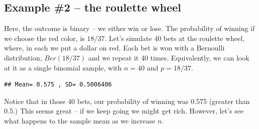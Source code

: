 \subsection{Example \#2 -- the roulette wheel}
Here, the outcome is binary -- we either win or lose. The probability of winning if we choose the red color, is $18/37$.
Let's simulate 40 bets at the roulette wheel, where, in each we put a dollar on red. Each bet is won with a Bernoulli distribution, $Ber(18/37)$ and we repeat it 40 times. Equivalently, we can look at it as a single binomial sample, with $n=40$ and $p=18/37$.

\begin{knitrout}
\color{fgcolor}\begin{kframe}
\begin{alltt}
\hlstd{(}\hlstd{)}
 \hlkwb{<-} 
 \hlkwb{<-}  \hlstd{=}\hlstd{,} \hlstd{=}\hlopt{/}\hlstd{)}
\hlstd{(}\hlstd{,} \hlstd{,}\hlstd{)}
\end{alltt}
\begin{verbatim}
## Mean= 0.575 , SD= 0.5006406
\end{verbatim}
\end{kframe}
\end{knitrout}

Notice that in those 40 bets, our probability of winning was 0.575 (greater than 0.5.) This seems great -- if we keep going we might get rich. However, let's see what happens to the sample mean as we increase $n$. 


